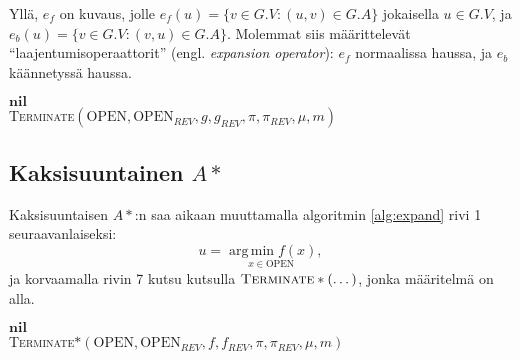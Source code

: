 \documentclass[finnish]{tktltiki2}
\newenvironment{finalgo}[1][htb]{
  \renewcommand{\algorithmcfname}{Algoritmi}
  \begin{algorithm}[#1]
}{\end{algorithm}}
\theoremstyle{definition}
\theoremstyle{remark}
\DeclareMathOperator*{\argmin}{arg\, min}
\begin{document}
Yllä, $e_f$ on kuvaus, jolle $e_f(u) = \{ v \in G.V \colon (u, v) \in G.A \}$ jokaisella $u \in G.V$, ja $e_b(u) = \{ v \in G.V \colon (v, u) \in G.A \}$. Molemmat siis määrittelevät ``laajentumisoperaattorit'' (engl. \textit{expansion operator}): $e_f$ normaalissa haussa, ja $e_b$ käännetyssä haussa.
\begin{finalgo}[H]
\KwRet $\textbf{nil}$ \\
\caption{\textsc{Terminate}$(\text{OPEN}, \text{OPEN}_{REV}, g, g_{REV}, \pi, \pi_{REV}, \mu, m)$}
\label{alg:bidijkstraterminate}
\end{finalgo}

\subsection{Kaksisuuntainen $A\ast$}
Kaksisuuntaisen $A\ast$:n saa aikaan muuttamalla algoritmin \ref{alg:expand} rivi 1 seuraavanlaiseksi:
\[
u = \underset{x \in \text{OPEN}}{\argmin f(x)},
\]
ja korvaamalla rivin 7 kutsu kutsulla $\textsc{Terminate}\ast(\dots)$, jonka määritelmä on alla.
\begin{finalgo}[h]
\KwRet $\textbf{nil}$ \\
\caption{\textsc{Terminate$\ast$}$(\text{OPEN}, \text{OPEN}_{REV}, f, f_{REV}, \pi, \pi_{REV}, \mu, m)$}
\label{alg:tryterminatestar}
\end{finalgo}
\end{document}
